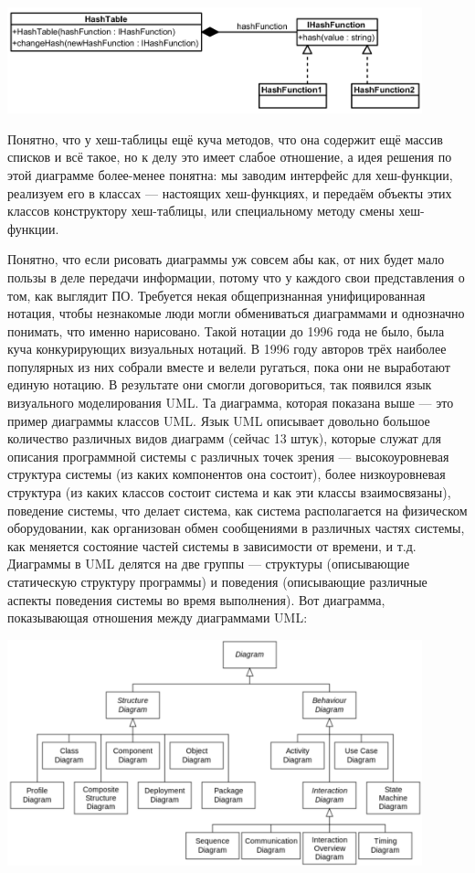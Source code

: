 \documentclass{../../text-style}
\begin{document}
\begin{center}
    \includegraphics[width=0.9\textwidth]{modelExample.png}
\end{center}

Понятно, что у хеш-таблицы ещё куча методов, что она содержит ещё массив списков и всё такое, но к делу это имеет слабое отношение, а идея решения по этой диаграмме более-менее понятна: мы заводим интерфейс для хеш-функции, реализуем его в классах --- настоящих хеш-функциях, и передаём объекты этих классов конструктору хеш-таблицы, или специальному методу смены хеш-функции.

Понятно, что если рисовать диаграммы уж совсем абы как, от них будет мало пользы в деле передачи информации, потому что у каждого свои представления о том, как выглядит ПО. Требуется некая общепризнанная унифицированная нотация, чтобы незнакомые люди могли обмениваться диаграммами и однозначно понимать, что именно нарисовано. Такой нотации до 1996 года не было, была куча конкурирующих визуальных нотаций. В 1996 году авторов трёх наиболее популярных из них собрали вместе и велели ругаться, пока они не выработают единую нотацию. В результате они смогли договориться, так появился язык визуального моделирования UML. Та диаграмма, которая показана выше --- это пример диаграммы классов UML. Язык UML описывает довольно большое количество различных видов диаграмм (сейчас 13 штук), которые служат для описания программной системы с различных точек зрения --- высокоуровневая структура системы (из каких компонентов она состоит), более низкоуровневая структура (из каких классов состоит система и как эти классы взаимосвязаны), поведение системы, что делает система, как система располагается на физическом оборудовании, как организован обмен сообщениями в различных частях системы, как меняется состояние частей системы в зависимости от времени, и т.д. Диаграммы в UML делятся на две группы --- структуры (описывающие статическую структуру программы) и поведения (описывающие различные аспекты поведения системы во время выполнения). Вот диаграмма, показывающая отношения между диаграммами UML:

\begin{center}
    \includegraphics[width=0.9\textwidth]{umlDiagrams.png}
\end{center}
\end{document}
